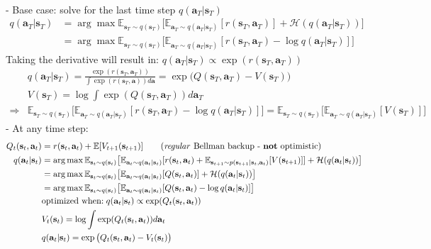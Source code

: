 \\
- Base case: solve for the last time step $q(\textbf{a}_T | \textbf{s}_T)$
\begin{align*}
	q(\textbf{a}_T | \textbf{s}_T) &= \arg\max \mathbb{E}_{\textbf{s}_T \sim q (\textbf{s}_T)} \big[ \mathbb{E}_{\textbf{a}_T \sim q (\textbf{a}_T | \textbf{s}_T)} [r(\textbf{s}_T, \textbf{a}_T)] + \mathcal{H}(q(\textbf{a}_T | \textbf{s}_T)) \big]\\
	&= \arg\max \mathbb{E}_{\textbf{s}_T \sim q (\textbf{s}_T)} \big[ \mathbb{E}_{\textbf{a}_T \sim q (\textbf{a}_T | \textbf{s}_T)} [r(\textbf{s}_T, \textbf{a}_T) - \log q(\textbf{a}_T | \textbf{s}_T)] \big]
\end{align*}
Taking the derivative will result in: $q(\textbf{a}_T | \textbf{s}_T) \propto \exp(r(\textbf{s}_T, \textbf{a}_T))$
\begin{align}
	&q(\textbf{a}_T | \textbf{s}_T) = \frac{\exp (r(\textbf{s}_T, \textbf{a}_T))}{\int \exp(r(\textbf{s}_T, \textbf{a})) d\textbf{a}} = \exp \big( Q(\textbf{s}_T, \textbf{a}_T) - V(\textbf{s}_T) \big)\\
	&V(\textbf{s}_T) = \log \int \exp (Q(\textbf{s}_T, \textbf{a}_T)) d\textbf{a}_T\\
	\Rightarrow &\mathbb{E}_{\textbf{s}_T \sim q (\textbf{s}_T)} \big[ \mathbb{E}_{\textbf{a}_T \sim q (\textbf{a}_T | \textbf{s}_T)} [r(\textbf{s}_T, \textbf{a}_T) - \log q(\textbf{a}_T | \textbf{s}_T)] \big] = \mathbb{E}_{\textbf{s}_T \sim q (\textbf{s}_T)} \big[ \mathbb{E}_{\textbf{a}_T \sim q (\textbf{a}_T | \textbf{s}_T)} [V(\textbf{s}_T)] \big]
\end{align}
- At any time step: 
\begin{align*}
	Q_t(\textbf{s}_t, \textbf{a}_t) &= r(\textbf{s}_t, \textbf{a}_t) + \mathbb{E}[V_{t+1}(\textbf{s}_{t+1})] \qquad\text{(\textit{regular }Bellman backup - \textbf{not} optimistic)}\\
	q(\textbf{a}_t | \textbf{s}_t) &= \arg\max \mathbb{E}_{\textbf{s}_t \sim q (\textbf{s}_t)} \big[ \mathbb{E}_{\textbf{a}_t \sim q (\textbf{a}_t | \textbf{s}_t)} [r(\textbf{s}_t, \textbf{a}_t) + \mathbb{E}_{\textbf{s}_{t+1} \sim p(\textbf{s}_{t+1} | \textbf{s}_t, \textbf{a}_t)}[V(\textbf{s}_{t+1})]] + \mathcal{H}(q(\textbf{a}_t | \textbf{s}_t)) \big]\\
	&= \arg\max \mathbb{E}_{\textbf{s}_t \sim q (\textbf{s}_t)} \big[ \mathbb{E}_{\textbf{a}_t \sim q (\textbf{a}_t | \textbf{s}_t)} [Q(\textbf{s}_t, \textbf{a}_t)] + \mathcal{H}(q(\textbf{a}_t | \textbf{s}_t)) \big]\\
	&= \arg\max \mathbb{E}_{\textbf{s}_t \sim q (\textbf{s}_t)} \big[ \mathbb{E}_{\textbf{a}_t \sim q (\textbf{a}_t | \textbf{s}_t)} [Q(\textbf{s}_t, \textbf{a}_t) - \log q(\textbf{a}_t | \textbf{s}_t) ]\big]\\
	&\text{optimized when:}\; q(\textbf{a}_t | \textbf{s}_t) \propto \exp(Q_t(\textbf{s}_t, \textbf{a}_t))\\
	&V_t(\textbf{s}_t) = \log \int \exp(Q_t(\textbf{s}_t, \textbf{a}_t)) d\textbf{a}_t\\
	&q(\textbf{a}_t | \textbf{s}_t) = \exp \big( Q_t(\textbf{s}_t, \textbf{a}_t) - V_t(\textbf{s}_t) \big)
\end{align*}

